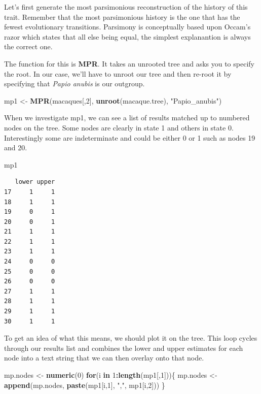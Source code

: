 \documentclass[
]{book}
\newenvironment{Shaded}{\begin{snugshade}}{\end{snugshade}}
\newcommand{\ControlFlowTok}[1]{\textcolor[rgb]{0.13,0.29,0.53}{\textbf{#1}}}
\newcommand{\DecValTok}[1]{\textcolor[rgb]{0.00,0.00,0.81}{#1}}
\newcommand{\KeywordTok}[1]{\textcolor[rgb]{0.13,0.29,0.53}{\textbf{#1}}}
\newcommand{\NormalTok}[1]{#1}
\newcommand{\OperatorTok}[1]{\textcolor[rgb]{0.81,0.36,0.00}{\textbf{#1}}}
\newcommand{\StringTok}[1]{\textcolor[rgb]{0.31,0.60,0.02}{#1}}
\begin{document}
Let's first generate the most parsimonious reconstruction of the history of this trait. Remember that the most parsimonious history is the one that has the fewest evolutionary transitions. Parsimony is conceptually based upon Occam's razor which states that all else being equal, the simplest explanantion is always the correct one.

The function for this is \textbf{MPR}. It takes an unrooted tree and asks you to specify the root. In our case, we'll have to unroot our tree and then re-root it by specifying that \emph{Papio anubis} is our outgroup.

\begin{Shaded}
\begin{Highlighting}[]
\NormalTok{mp1 \textless{}{-}}\StringTok{ }\KeywordTok{MPR}\NormalTok{(macaques[,}\DecValTok{2}\NormalTok{], }\KeywordTok{unroot}\NormalTok{(macaque.tree), }\StringTok{"Papio\_anubis"}\NormalTok{)}
\end{Highlighting}
\end{Shaded}

When we investigate mp1, we can see a list of results matched up to numbered nodes on the tree. Some nodes are clearly in state 1 and others in state 0. Interestingly some are indeterminate and could be either 0 or 1 such as nodes 19 and 20.

\begin{Shaded}
\begin{Highlighting}[]
\NormalTok{mp1}
\end{Highlighting}
\end{Shaded}

\begin{verbatim}
   lower upper
17     1     1
18     1     1
19     0     1
20     0     1
21     1     1
22     1     1
23     1     1
24     0     0
25     0     0
26     0     0
27     1     1
28     1     1
29     1     1
30     1     1
\end{verbatim}

To get an idea of what this means, we should plot it on the tree. This loop cycles through our results list and combines the lower and upper estimates for each node into a text string that we can then overlay onto that node.

\begin{Shaded}
\begin{Highlighting}[]
\NormalTok{mp.nodes \textless{}{-}}\StringTok{ }\KeywordTok{numeric}\NormalTok{(}\DecValTok{0}\NormalTok{)}
\ControlFlowTok{for}\NormalTok{(i }\ControlFlowTok{in} \DecValTok{1}\OperatorTok{:}\KeywordTok{length}\NormalTok{(mp1[,}\DecValTok{1}\NormalTok{]))\{}
\NormalTok{  mp.nodes \textless{}{-}}\StringTok{ }\KeywordTok{append}\NormalTok{(mp.nodes, }\KeywordTok{paste}\NormalTok{(mp1[i,}\DecValTok{1}\NormalTok{], }\StringTok{","}\NormalTok{, mp1[i,}\DecValTok{2}\NormalTok{]))}
\NormalTok{\}}
\end{Highlighting}
\end{Shaded}
\end{document}

